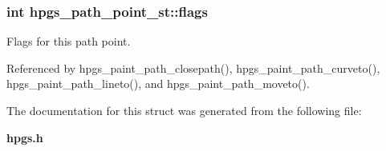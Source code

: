 \subsubsection[flags]{\setlength{\rightskip}{0pt plus 5cm}int {\bf hpgs\_\-path\_\-point\_\-st::flags}}\label{structhpgs__path__point__st_1a077ee4742f3a52cc403e82b997a1bc}


Flags for this path point. 

Referenced by hpgs\_\-paint\_\-path\_\-closepath(), hpgs\_\-paint\_\-path\_\-curveto(), hpgs\_\-paint\_\-path\_\-lineto(), and hpgs\_\-paint\_\-path\_\-moveto().

The documentation for this struct was generated from the following file:\begin{CompactItemize}
\item 
{\bf hpgs.h}\end{CompactItemize}
